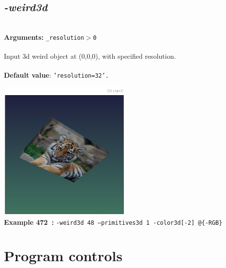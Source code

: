 \documentclass[a4paper,11pt,twoside]{book}
\begin{document}
\subsection{\emph{-weird3d} }\vspace*{-0.5em}
~\\\textbf{Arguments: } 
{\small \texttt{\_resolution$>$0}}\\~\\
Input 3d weird object at (0,0,0), with specified resolution.
~\\~\\\textbf{Default value}: {\small \texttt{'resolution=32'.}}
\begin{center}\includegraphics[keepaspectratio=true,height=7cm,width=\textwidth]{img/gmic_def472.jpg}\\
{\footnotesize \textbf{Example 472~:} \texttt{-weird3d 48 --primitives3d 1 -color3d[-2] @\{-RGB\}}}
\end{center}
\section{Program controls}
\end{document}
